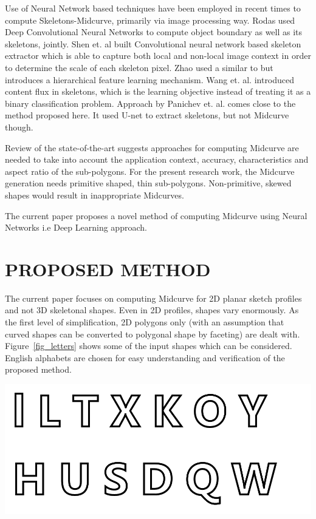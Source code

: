 \documentclass[9pt,academicons]{article}
\begin{document}
Use of Neural Network based techniques have been employed in recent times to compute Skeletons-Midcurve, primarily via image processing way. Rodas \cite{Rodas2019JointOB} used Deep Convolutional Neural Networks to compute object boundary as well as its skeletons, jointly. Shen et. al \cite{shen2016object,Shen_2017} built Convolutional neural network based skeleton extractor which is able to capture both local and non-local image context in order to determine the scale of each skeleton pixel. Zhao \cite{zhao2018hifi} used a similar to \cite{shen2016object,Shen_2017} but introduces a hierarchical feature learning mechanism. Wang et. al.\cite{wang2018deepflux} introduced content flux in skeletons, which is
the learning objective instead of treating it as a binary classification problem. Approach by Panichev et. al. \cite{Panichev_2019_CVPR_Workshops} comes close to the method proposed here. It used U-net to extract skeletons, but not Midcurve though.
	
Review of the state-of-the-art suggests approaches for computing Midcurve are needed to take into account the application context, accuracy, characteristics  and aspect ratio of the sub-polygons. For the present research work, the Midcurve generation needs primitive shaped, thin sub-polygons. Non-primitive, skewed shapes would result in inappropriate Midcurves.

The current paper proposes a novel method of computing Midcurve using Neural Networks i.e Deep Learning approach.
 
 
\section{PROPOSED METHOD}
\label{sec:proposedmethod}

The current paper focuses on computing Midcurve for 2D planar sketch profiles and not 3D skeletonal shapes.  Even in 2D profiles, shapes vary enormously. As the first level of simplification, 2D polygons only (with an assumption that curved shapes can be converted to polygonal shape by faceting) are dealt with. Figure~\ref{fig_letters} shows some of the input shapes which can be considered. English alphabets are chosen for easy understanding and verification of the proposed method.

     \begin{center}
	\includegraphics[width=0.9\linewidth]{images/Letters}
	\label{fig_letters}
    \end{center}
		
\end{document}
